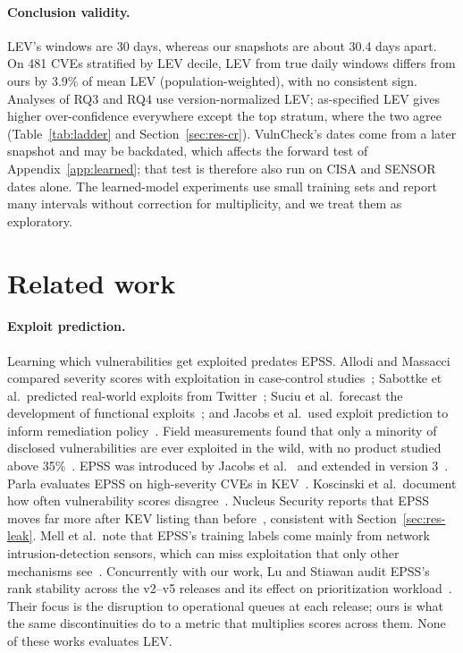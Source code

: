 \paragraph{Conclusion validity.} LEV's windows are 30 days, whereas our
snapshots are about 30.4 days apart. On 481 CVEs stratified by LEV decile, LEV
from true daily windows differs from ours by 3.9\% of mean LEV
(population-weighted), with no consistent sign. Analyses of RQ3 and RQ4 use
version-normalized LEV; as-specified LEV gives higher over-confidence
everywhere except the top stratum, where the two agree (Table~\ref{tab:ladder}
and Section~\ref{sec:res-cr}). VulnCheck's dates come from a later snapshot and
may be backdated, which affects the forward test of
Appendix~\ref{app:learned}; that test is therefore also run on CISA and SENSOR
dates alone. The learned-model experiments use small training sets and report
many intervals without correction for multiplicity, and we treat them as
exploratory.

\section{Related work}\label{sec:related}

\paragraph{Exploit prediction.} Learning which vulnerabilities get exploited
predates EPSS. Allodi and Massacci compared severity scores with exploitation
in case-control studies~\cite{allodi2014casecontrol}; Sabottke et al.\ predicted
real-world exploits from Twitter~\cite{sabottke2015twitter}; Suciu et al.\
forecast the development of functional exploits~\cite{suciu2022expected}; and
Jacobs et al.\ used exploit prediction to inform remediation
policy~\cite{jacobs2020remediation}. Field measurements found that only a
minority of disclosed vulnerabilities are ever exploited in the wild, with no
product studied above 35\%~\cite{nayak2014different}. EPSS was introduced by
Jacobs et al.~\cite{jacobs2021epss} and extended in version
3~\cite{jacobs2023epssv3}. Parla evaluates EPSS on high-severity CVEs in
KEV~\cite{parla2024}. Koscinski et al.\ document how often vulnerability scores
disagree~\cite{koscinski2025conflicting}. Nucleus Security reports that EPSS
moves far more after KEV listing than before~\cite{netzer2026late}, consistent
with Section~\ref{sec:res-leak}. Mell et al.\ note that EPSS's training labels
come mainly from network intrusion-detection sensors, which can miss
exploitation that only other mechanisms see~\cite{mell2024weaknesses}.
Concurrently with our work, Lu and Stiawan audit EPSS's rank stability across
the v2--v5 releases and its effect on prioritization
workload~\cite{lu2026queueshock}. Their focus is the disruption to operational
queues at each release; ours is what the same discontinuities do to a metric
that multiplies scores across them. None of these works evaluates LEV.

